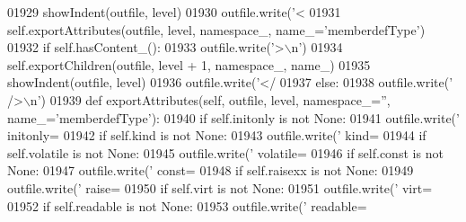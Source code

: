 \begin{DoxyCode}
{{{{{{{{{{{{{{{{{{{{{{{{{{{{{{{{{{{{{{{{{{{{{{{{{{{{{{{{{{{{{{{{{{{{{{{{{{{{{{{{{{{{{{{{{{{{{{{{{{{{{{{{{{{{{{{{{{01929         showIndent(outfile, level)
01930         outfile.write(\textcolor{stringliteral}{'<%
01931         self.exportAttributes(outfile, level, namespace\_, name\_=\textcolor{stringliteral}{'memberdefType'})
01932         \textcolor{keywordflow}{if} self.hasContent_():
01933             outfile.write(\textcolor{stringliteral}{'>\(\backslash\)n'})
01934             self.exportChildren(outfile, level + 1, namespace\_, name\_)
01935             showIndent(outfile, level)
01936             outfile.write(\textcolor{stringliteral}{'</%
01937         \textcolor{keywordflow}{else}:
01938             outfile.write(\textcolor{stringliteral}{' />\(\backslash\)n'})
01939     \textcolor{keyword}{def }exportAttributes(self, outfile, level, namespace\_='', name\_='memberdefType'):
01940         \textcolor{keywordflow}{if} self.initonly \textcolor{keywordflow}{is} \textcolor{keywordflow}{not} \textcolor{keywordtype}{None}:
01941             outfile.write(\textcolor{stringliteral}{' initonly=%
01942         \textcolor{keywordflow}{if} self.kind \textcolor{keywordflow}{is} \textcolor{keywordflow}{not} \textcolor{keywordtype}{None}:
01943             outfile.write(\textcolor{stringliteral}{' kind=%
01944         \textcolor{keywordflow}{if} self.volatile \textcolor{keywordflow}{is} \textcolor{keywordflow}{not} \textcolor{keywordtype}{None}:
01945             outfile.write(\textcolor{stringliteral}{' volatile=%
01946         \textcolor{keywordflow}{if} self.const \textcolor{keywordflow}{is} \textcolor{keywordflow}{not} \textcolor{keywordtype}{None}:
01947             outfile.write(\textcolor{stringliteral}{' const=%
01948         \textcolor{keywordflow}{if} self.raisexx \textcolor{keywordflow}{is} \textcolor{keywordflow}{not} \textcolor{keywordtype}{None}:
01949             outfile.write(\textcolor{stringliteral}{' raise=%
01950         \textcolor{keywordflow}{if} self.virt \textcolor{keywordflow}{is} \textcolor{keywordflow}{not} \textcolor{keywordtype}{None}:
01951             outfile.write(\textcolor{stringliteral}{' virt=%
01952         \textcolor{keywordflow}{if} self.readable \textcolor{keywordflow}{is} \textcolor{keywordflow}{not} \textcolor{keywordtype}{None}:
01953             outfile.write(\textcolor{stringliteral}{' readable=%
}}}}}}}}}}}}}}}}}}}}}}}}}}}}}}}}}}}}}}}}}}}}}}}}}}}}}}}}}}}}}}}}}}}}}}}}}}}}}}}}}}}}}}}}}}}}}}}}}}}}}}}}}}}}}}}}}}}}}}}}}}}
\end{DoxyCode}
